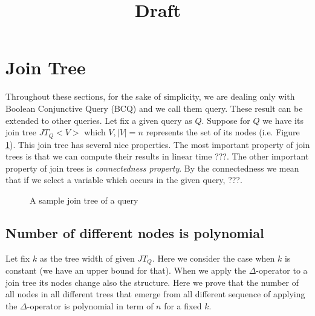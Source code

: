 \documentclass[12pt]{article}
\begin{document}
\title{Draft}
\date{}
\maketitle
\section{Join Tree}
Throughout these sections, for the sake of simplicity, we are dealing only with Boolean Conjunctive Query (BCQ) and we call them query. These result can be extended to other queries. 
Let fix a given query  as $Q$. Suppose for $Q$  we have its join tree $JT_{Q}<V>$ which $V, |V|=n$ represents the set of its nodes (i.e. Figure \ref{fig1}). 
This join tree has several nice properties. The most important property of join trees is that we can compute their results in linear time ???.
The other important property of join trees is \emph{connectedness property}. By the connectedness we mean that if we select a variable which occurs in the given query, ???. 

\begin{figure}[htbp]
\begin{center}
\end{center}
\caption{A sample join tree of a query}
\label{fig1}
\end{figure}
\subsection{Number of different nodes is polynomial}
Let fix $k$ as the tree width of given $JT_{Q}$. Here we consider the case when $k$ is constant (we have an upper bound for that).
When we apply the $\Delta$-operator to a join tree its nodes change also the structure. Here we prove that the number of all nodes in all different trees that emerge from all different sequence of applying the $\Delta$-operator is polynomial in term of $n$ for a fixed $k$.\\
\end{document}
